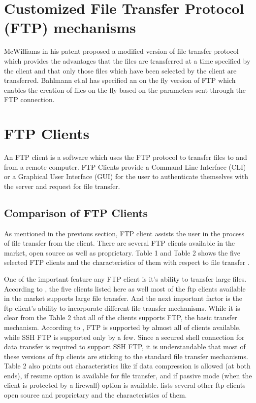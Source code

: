 \documentclass[9pt,twocolumn,twoside]{styles/osajnl}
\begin{document}
\section{Customized File Transfer Protocol (FTP) mechanisms}
McWilliams in his patent \cite{mcwilliams2001high} proposed a modified version of file transfer protocol which provides the advantages that the files are transferred at a time specified by the client and that only those files which have been selected by the client are transferred. Bahlmann et.al  has specified an on the fly version of FTP \cite{bahlmann2001fly} which enables the creation of files on the fly based on the parameters sent through the FTP connection.

\section{FTP Clients}
An FTP client is a software which uses the FTP protocol to transfer files to and from a remote computer. FTP Clients provide a Command Line Interface (CLI) or a Graphical User Interface (GUI) for the user to authenticate themselves with the server and request for file transfer.
\subsection{Comparison of FTP Clients}
As mentioned in the previous section, FTP client assists the user in the process of file transfer from the client. There are several FTP clients available in the market, open source as well as proprietary. Table 1 and Table 2 shows the five selected FTP clients and the characteristics of them with respect to file transfer \cite{www-wiki-ftpclientcomp}.

One of the important feature any FTP client is it's ability to transfer large files. According to \cite{www-wiki-ftpclientcomp}, the five clients listed here as well most of the ftp clients available in the market supports large file transfer. And the next important factor is the ftp client's ability to incorporate different file transfer mechanisms. While it is clear from the Table 2 that all of the clients supports FTP, the basic transfer mechanism. According to \cite{www-wiki-ftpclientcomp}, FTP is supported by almost all of clients available, while SSH FTP is supported only by a few. Since a secured shell connection for data transfer is required to support SSH FTP, it is understandable that most of these versions of ftp clients are sticking to the standard file transfer mechanisms. Table 2 also points out characteristics like if data compression is allowed (at both ends), if resume option is available for file transfer, and if passive mode (when the client is protected by a firewall) option is available. \cite{www-wiki-ftpclientcomp} lists several other ftp clients open source and proprietary and the characteristics of them.
\end{document}
